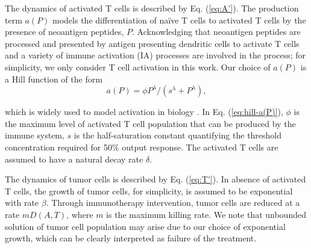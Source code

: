 \documentclass[review,authoryear]{elsarticle}
\begin{document}
The dynamics of activated T cells is described by Eq. (\ref{eq:A'}). The production term $a(P)$ models the differentiation of na\"ive T cells to activated T cells by the presence of neoantigen peptides, $P$. Acknowledging that neoantigen peptides are processed and presented by antigen presenting dendritic cells to activate T cells and a variety of immune activation (IA) processes are involved in the process; for simplicity, we only consider T cell activation in this work. Our choice of $a(P)$ is a Hill function of the form   
\begin{equation} \label{eq:hill-a(P)}
a(P)=\phi P^{\lambda}/(s^{\lambda}+P^{\lambda}), 
\end{equation}

which is widely used to model activation in biology \citep{Somvanshi2013}. In Eq. (\ref{eq:hill-a(P)}), $\phi$ is the maximum level of activated T cell population that can be produced by the immune system, $s$ is the half-saturation constant quantifying the threshold concentration required for 50\% output response. The activated T cells are assumed to have a natural decay rate $\delta$.

The dynamics of tumor cells is described by Eq. (\ref{eq:T'}). In absence of activated T cells, the growth of tumor cells, for simplicity, is assumed to be exponential with rate $\beta$. Through immunotherapy intervention, tumor cells are reduced at a rate $mD(A,T)$, where $m$ is the maximum killing rate. We note that unbounded solution of tumor cell population may arise due to our choice of exponential growth, which can be clearly interpreted as failure of the treatment. 
\end{document}

